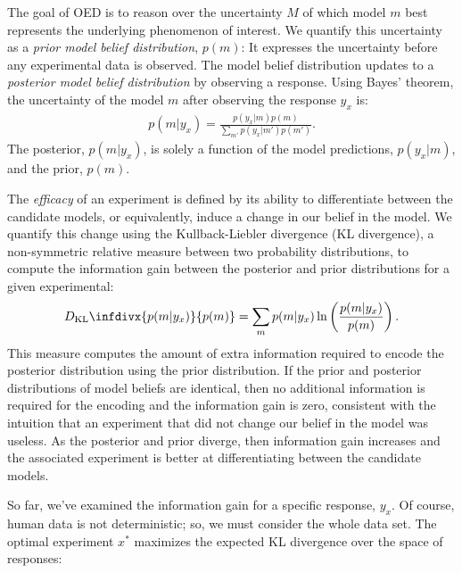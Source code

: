 \documentclass{article}
\newcommand{\dkl}{D_\textrm{KL}\infdivx}
\begin{document}
The goal of OED is to reason over the uncertainty $M$ of which model $m$ best represents the underlying phenomenon of interest. We quantify this uncertainty as a \emph{prior model belief distribution}, $p(m)$: It expresses the uncertainty before any experimental data is observed.
The model belief distribution updates to a \emph{posterior model belief distribution} by observing a response. Using Bayes' theorem, the uncertainty of the model $m$ after observing the response $y_x$ is:
\begin{align}
p(m|y_x) = \frac{p(y_x|m)p(m)}{\sum\limits_{m'} p(y_x|m')p(m')}. \label{eq:bayes}
\end{align}
The posterior, $p(m|y_x)$, is solely a function of the model predictions, $p(y_x|m)$, and the prior, $p(m)$.

The \emph{efficacy} of an experiment is defined by its ability to differentiate between the candidate models, or equivalently, induce a change in our belief in the model. We quantify this change using the Kullback-Liebler divergence (KL divergence), a non-symmetric relative measure between two probability distributions, to compute the information gain between the posterior and prior distributions for a given experimental:
\begin{align}
\dkl{ p(m|y_x) }{ p(m) }  = \sum\limits_m p(m|y_x) \ln \left( \frac{p(m|y_x)}{p(m)}\right). \label{eq:kl}
\end{align}
This measure computes the amount of extra information required to encode the posterior distribution using the prior distribution. If the prior and posterior distributions of model beliefs are identical, then no additional information is required for the encoding and the information gain is zero, consistent with the intuition that an experiment that did not change our belief in the model was useless. As the posterior and prior diverge, then information gain increases and the associated experiment is better at differentiating between the candidate models.

So far, we've examined the information gain for a specific response, $y_x$.
Of course, human data is not deterministic; so, we must consider the whole data set.
The optimal experiment $x^*$ maximizes the expected KL divergence over the space of responses:
\end{document}
